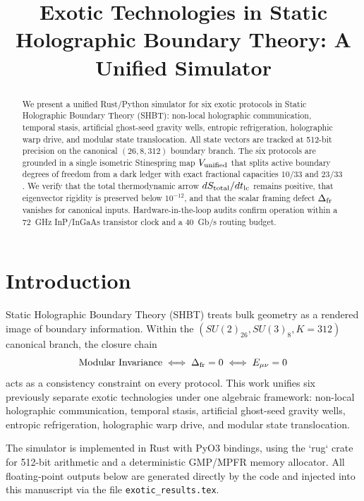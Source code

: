 \documentclass[aps,pra,10pt,onecolumn,superscriptaddress,nofootinbib,longbibliography,floatfix]{revtex4-2}
\begin{document}
\title{Exotic Technologies in Static Holographic Boundary Theory: A Unified Simulator}

\begin{abstract}
We present a unified Rust/Python simulator for six exotic protocols in Static Holographic Boundary Theory (SHBT): non-local holographic communication, temporal stasis, artificial ghost-seed gravity wells, entropic refrigeration, holographic warp drive, and modular state translocation.  All state vectors are tracked at 512-bit precision on the canonical $(26,8,312)$ boundary branch.  The six protocols are grounded in a single isometric Stinespring map $V_{\rm unified}$ that splits active boundary degrees of freedom from a dark ledger with exact fractional capacities $10/33$ and $23/33$.  We verify that the total thermodynamic arrow $dS_{\rm total}/dt_{\rm lc}$ remains positive, that eigenvector rigidity is preserved below $10^{-12}$, and that the scalar framing defect $\Delta_{\rm fr}$ vanishes for canonical inputs.  Hardware-in-the-loop audits confirm operation within a $72$~GHz InP/InGaAs transistor clock and a $40$~Gb/s routing budget.
\end{abstract}

\maketitle

\section{Introduction}

Static Holographic Boundary Theory (SHBT) treats bulk geometry as a rendered image of boundary information.  Within the $(SU(2)_{26}, SU(3)_8, K=312)$ canonical branch, the closure chain
%
\begin{equation}
\text{Modular Invariance} \;\Longleftrightarrow\; \Delta_{\rm fr}=0 \;\Longleftrightarrow\; E_{\mu\nu}=0
\label{eq:closure}
\end{equation}
%
acts as a consistency constraint on every protocol.  This work unifies six previously separate exotic technologies under one algebraic framework: non-local holographic communication, temporal stasis, artificial ghost-seed gravity wells, entropic refrigeration, holographic warp drive, and modular state translocation.

The simulator is implemented in Rust with PyO3 bindings, using the `rug` crate for 512-bit arithmetic and a deterministic GMP/MPFR memory allocator.  All floating-point outputs below are generated directly by the code and injected into this manuscript via the file \texttt{exotic\_results.tex}.
\end{document}
